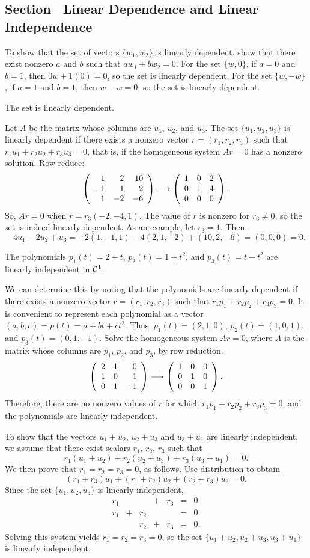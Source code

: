 \documentclass{ximera}
\begin{document}
\subsection*{Section~\protect{\ref{S:5.4}} Linear Dependence and Linear
Independence}

To show that the set of vectors $\{w_1,w_2\}$ is linearly dependent,
show that there exist nonzero $a$ and $b$ such that
$aw_1 + bw_2 = 0$.  For the set $\{w,0\}$, if $a = 0$ and $b = 1$,
then $0w + 1(0) = 0$, so the set is linearly dependent.  For the
set $\{w,-w\}$, if $a = 1$ and $b = 1$, then
$w - w = 0$, so the set is linearly dependent.

\ans The set is linearly dependent.

\soln Let $A$ be the matrix whose columns are $u_1$, $u_2$, and $u_3$. 
The set $\{u_1,u_2,u_3\}$ is linearly dependent if there exists
a nonzero vector $r = (r_1,r_2,r_3)$ such that $r_1u_1 + r_2u_2 +
r_3u_3 = 0$, that is, if the homogeneous system $Ar = 0$ has a
nonzero solution.  Row reduce:
\[
\left(\begin{array}{rrr} 1 & 2 & 10 \\ -1 & 1 & 2 \\ 1 & -2 & -6\end{array}\right) \longrightarrow
\left(\begin{array}{rrr} 1 & 0 & 2 \\ 0 & 1 & 4 \\ 0 & 0 & 0\end{array}\right).
\]
So, $Ar = 0$ when $r = r_3(-2,-4,1)$.
The value of $r$ is nonzero for $r_3 \neq 0$, so the set is indeed
linearly dependent.
As an example, let $r_3 = 1$.  Then,
\[
-4u_1 - 2u_2 + u_3 = -2(1,-1,1) - 4(2,1,-2) + (10,2,-6) =
(0,0,0) = 0.
\]

\ans The polynomials $p_1(t) = 2 + t$, $p_2(t) = 1 + t^2$, and $p_3(t) =
t - t^2$ are linearly independent in ${\cal C}^1$.  

\soln We can determine this
by noting that the polynomials are linearly dependent if there exists
a nonzero vector $r = (r_1,r_2,r_3)$ such that $r_1p_1 + r_2p_2 +
r_3p_3 = 0$.  It is convenient to represent each polynomial as a
vector $(a,b,c) = p(t) = a + bt + ct^2$.  Thus, $p_1(t) = (2,1,0)$, 
$p_2(t) = (1,0,1)$, and $p_3(t) = (0,1,-1)$.  Solve the homogeneous
system $Ar = 0$, where $A$ is the matrix whose columns are $p_1$,
$p_2$, and $p_3$, by row reduction.
\[ \left(\begin{array}{rrr} 2 & 1 & 0 \\ 1 & 0 & 1 \\ 0 & 1 & -1\end{array}\right) \longrightarrow
\left(\begin{array}{rrr} 1 & 0 & 0 \\ 0 & 1 & 0 \\ 0 & 0 & 1\end{array}\right). \]
Therefore, there are no nonzero values of $r$ for which $r_1p_1 + 
r_2p_2 + r_3p_3 = 0$, and the polynomials are linearly independent.

To show that the vectors $u_1 + u_2$, $u_2 + u_3$ and $u_3 + u_1$
are linearly independent, we assume that there exist scalars $r_1$,
$r_2$, $r_3$ such that
\[ r_1(u_1 + u_2) + r_2(u_2 + u_3) + r_3(u_3 + u_1) = 0. \]
We then prove that $r_1 = r_2 = r_3 = 0$, as follows.
Use distribution to obtain
\[ (r_1 + r_3)u_1 + (r_1 + r_2)u_2 + (r_2 + r_3)u_3 = 0. \]
Since the set $\{u_1,u_2,u_3\}$ is linearly independent,
\[ \begin{array}{rrrrrcl}
r_1 & & & + & r_3 & = & 0 \\
r_1 & + & r_2 & & & = & 0 \\
& & r_2 & + & r_3 & = & 0. \end{array} \]
Solving this system yields $r_1 = r_2 = r_3 = 0$,
so the set $\{u_1 + u_2,u_2 + u_3,u_3 + u_1\}$ is linearly
independent.
\end{document}
